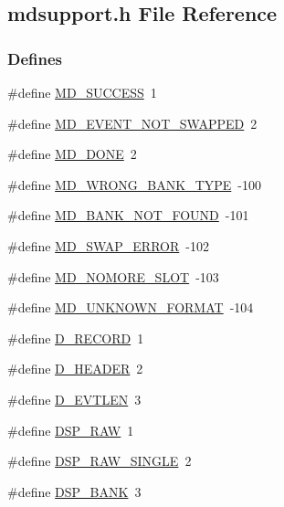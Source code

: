 \subsection{mdsupport.h File Reference}
\label{mdsupport_8h}
\subsubsection*{Defines}
\begin{DoxyCompactItemize}
\item 
\#define \hyperlink{group__mdsupporterrorh_gab1b41e3db6549318f90440ed951d9cf8}{MD\_\-SUCCESS}~1
\item 
\#define \hyperlink{group__mdsupporterrorh_ga34a6e506a7e596c2c044e51ed5d8359d}{MD\_\-EVENT\_\-NOT\_\-SWAPPED}~2
\item 
\#define \hyperlink{group__mdsupporterrorh_ga34fdf952284be03aca04a46985b2e57f}{MD\_\-DONE}~2
\item 
\#define \hyperlink{group__mdsupporterrorh_ga272861cd4d9ff8e05d3f2aafc4489f10}{MD\_\-WRONG\_\-BANK\_\-TYPE}~-\/100
\item 
\#define \hyperlink{group__mdsupporterrorh_gae69cfc80b79b199b65adac21a8dad19c}{MD\_\-BANK\_\-NOT\_\-FOUND}~-\/101
\item 
\#define \hyperlink{group__mdsupporterrorh_gaff1a819016cbf8084d88e0f78e548b60}{MD\_\-SWAP\_\-ERROR}~-\/102
\item 
\#define \hyperlink{group__mdsupporterrorh_ga0491dd8f0e546f496c4059b8c04dd309}{MD\_\-NOMORE\_\-SLOT}~-\/103
\item 
\#define \hyperlink{group__mdsupporterrorh_gae2f17985734efbefedfd5956b4e4a0f8}{MD\_\-UNKNOWN\_\-FORMAT}~-\/104
\item 
\#define \hyperlink{group__mdsupportdefineh_ga3690d638414357c1bd39dd1bcaff5c38}{D\_\-RECORD}~1
\item 
\#define \hyperlink{group__mdsupportdefineh_gafb32f9ec171fac7ce0a9c7b68236e21a}{D\_\-HEADER}~2
\item 
\#define \hyperlink{group__mdsupportdefineh_ga3ca85910f39037dcb031571d75d0fedc}{D\_\-EVTLEN}~3
\item 
\#define \hyperlink{group__mdsupportdefineh_ga91f9ebc9c69f56ea2a32c98fdd3830e4}{DSP\_\-RAW}~1
\item 
\#define \hyperlink{group__mdsupportdefineh_ga6ff7e1a3a24cccf987de9236010fdcac}{DSP\_\-RAW\_\-SINGLE}~2
\item 
\#define \hyperlink{group__mdsupportdefineh_gab226417737baf78d3965f812b2c58b53}{DSP\_\-BANK}~3
\item 

\end{DoxyCompactItemize}
